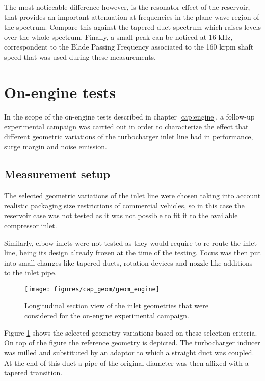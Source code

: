 The most noticeable difference however, is the resonator effect of the reservoir, that provides an important attenuation at frequencies in the plane wave region of the spectrum. Compare this against the tapered duct spectrum which raises levels over the whole spectrum. Finally, a small peak can be noticed at 16 kHz, correspondent to the Blade Passing Frequency  associated to the 160 krpm shaft speed that was used during these measurements.

\section{On-engine tests}
\label{sec:geom_motor}

In the scope of the on-engine tests described in chapter \ref{cap:engine}, a follow-up experimental campaign was carried out in order to characterize the effect that different geometric variations of the turbocharger inlet line had in performance, surge margin and noise emission.

\subsection{Measurement setup}

The selected geometric variations of the inlet line were chosen taking into account realistic packaging size restrictions of commercial vehicles, so in this case the reservoir case was not tested as it was not possible to fit it to the available compressor inlet. 

Similarly, elbow inlets were not tested as they would require to re-route the inlet line, being its design already frozen at the time of the testing. Focus was then put into small changes like tapered ducts, rotation devices and nozzle-like additions to the inlet pipe.

\begin{figure}[htb!]
\centering
\texttt{[image: figures/cap\_geom/geom\_engine]}
\caption{Longitudinal section view of the inlet geometries that were considered for the on-engine experimental campaign.}
\label{fig:geom_engine}
\end{figure}

Figure \ref{fig:geom_engine} shows the selected geometry variations based on these selection criteria. On top of the figure the reference geometry is depicted. The turbocharger inducer was milled and substituted by an adaptor to which a straight duct was coupled. At the end of this duct a pipe of the original diameter was then affixed with a tapered transition.

